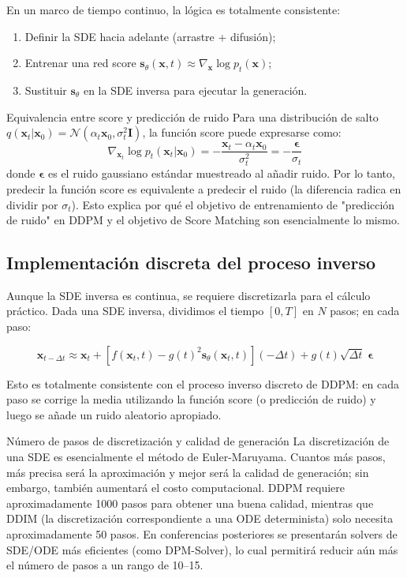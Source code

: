 \documentclass[a4paper]{article}
\begin{document}
En un marco de tiempo continuo, la lógica es totalmente consistente:
\begin{enumerate}
    \item Definir la SDE hacia adelante (arrastre + difusión);
    \item Entrenar una red score $\mathbf{s}_\theta(\mathbf{x}, t) \approx \nabla_{\mathbf{x}} \log p_t(\mathbf{x})$;
    \item Sustituir $\mathbf{s}_\theta$ en la SDE inversa para ejecutar la generación.
\end{enumerate}

\begin{knowledgebox}{Equivalencia entre score y predicción de ruido}
Para una distribución de salto $q(\mathbf{x}_t | \mathbf{x}_0) = \mathcal{N}(\alpha_t \mathbf{x}_0, \sigma_t^2 \mathbf{I})$, la función score puede expresarse como:
$$
\nabla_{\mathbf{x}_t} \log p_t(\mathbf{x}_t | \mathbf{x}_0) = -\frac{\mathbf{x}_t - \alpha_t \mathbf{x}_0}{\sigma_t^2} = -\frac{\boldsymbol{\epsilon}}{\sigma_t}
$$
donde $\boldsymbol{\epsilon}$ es el ruido gaussiano estándar muestreado al añadir ruido. Por lo tanto, predecir la función score es equivalente a predecir el ruido (la diferencia radica en dividir por $\sigma_t$). Esto explica por qué el objetivo de entrenamiento de "predicción de ruido" en DDPM y el objetivo de Score Matching son esencialmente lo mismo.
\end{knowledgebox}

\subsection{Implementación discreta del proceso inverso}

Aunque la SDE inversa es continua, se requiere discretizarla para el cálculo práctico. Dada una SDE inversa, dividimos el tiempo $[0, T]$ en $N$ pasos; en cada paso:

$$
\mathbf{x}_{t-\Delta t} \approx \mathbf{x}_t + \left[f(\mathbf{x}_t, t) - g(t)^2 \mathbf{s}_\theta(\mathbf{x}_t, t)\right](-\Delta t) + g(t)\sqrt{\Delta t}\;\boldsymbol{\epsilon}
$$

Esto es totalmente consistente con el proceso inverso discreto de DDPM: en cada paso se corrige la media utilizando la función score (o predicción de ruido) y luego se añade un ruido aleatorio apropiado.

\begin{warningbox}{Número de pasos de discretización y calidad de generación}
La discretización de una SDE es esencialmente el método de Euler-Maruyama. Cuantos más pasos, más precisa será la aproximación y mejor será la calidad de generación; sin embargo, también aumentará el costo computacional. DDPM requiere aproximadamente 1000 pasos para obtener una buena calidad, mientras que DDIM (la discretización correspondiente a una ODE determinista) solo necesita aproximadamente 50 pasos. En conferencias posteriores se presentarán solvers de SDE/ODE más eficientes (como DPM-Solver), lo cual permitirá reducir aún más el número de pasos a un rango de 10--15.
\end{warningbox}
\end{document}

